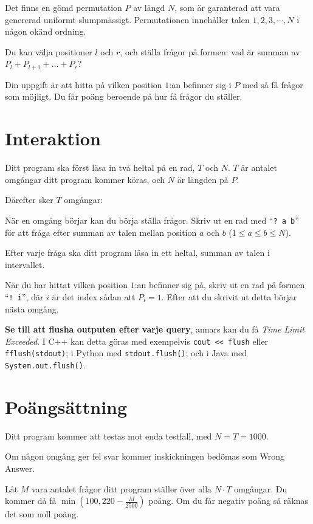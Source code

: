 
Det finns en gömd permutation $P$ av längd $N$, som är garanterad att vara genererad uniformt slumpmässigt.
Permutationen innehåller talen $1, 2, 3, \cdots, N$ i någon okänd ordning.

Du kan välja positioner $l$ och $r$, och ställa frågor på formen: vad är summan av $P_l + P_{l+1} + \ldots + P_r$?

Din uppgift är att hitta på vilken position $1$:an befinner sig i $P$ med så få frågor som möjligt.
Du får poäng beroende på hur få frågor du ställer.

\section*{Interaktion}

Ditt program ska först läsa in två heltal på en rad, $T$ och $N$. 
$T$ är antalet omgångar ditt program kommer köras, och $N$ är längden på $P$.

Därefter sker $T$ omgångar:

När en omgång börjar kan du börja ställa frågor. Skriv ut en rad med ``\verb|? a b|'' för
att fråga efter summan av talen mellan position $a$ och $b$ ($1 \leq a \leq b \leq N$).

Efter varje fråga ska ditt program läsa in ett heltal, summan av talen i intervallet.

När du har hittat vilken position $1$:an befinner sig på, skriv ut en rad på formen ``\verb|! i|'',
där $i$ är det index sådan att $P_i = 1$. Efter att du skrivit ut detta börjar nästa omgång.

\textbf{Se till att flusha outputen efter varje query}, annars kan du få \textit{Time Limit Exceeded}.
I C++ kan detta göras med exempelvis \texttt{cout << flush}
eller \texttt{fflush(stdout)};
i Python med \texttt{stdout.flush()};
och i Java med \texttt{System.out.flush()}.

\section*{Poängsättning}

Ditt program kommer att testas mot enda testfall, med $N = T = 1000$.

Om någon omgång ger fel svar kommer inskickningen bedömas som Wrong Answer.

Låt $M$ vara antalet frågor ditt program ställer över alla $N \cdot T$ omgångar. Du kommer då få
$\min(100, 220 - \frac{M}{2500})$ poäng. Om du får negativ poäng så räknas det som noll poäng.

